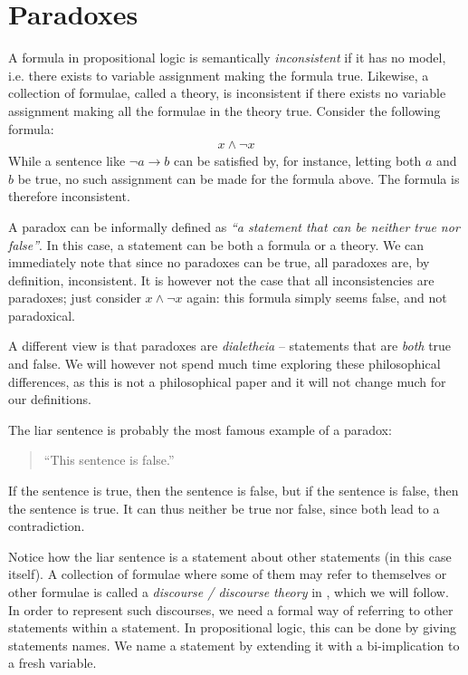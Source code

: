 \section{Paradoxes}
\label{sec:Paradoxes}
A formula in propositional logic is semantically \textit{inconsistent} if it has no model, i.e. there exists to variable assignment making the formula true.
Likewise, a collection of formulae, called a theory, is inconsistent if there exists no variable assignment making all the formulae in the theory true.
Consider the following formula:
\begin{align}
  x \wedge \neg x
\end{align}
While a sentence like $\neg a \rightarrow b$ can be satisfied by, for instance, letting both $a$ and $b$ be true, no such assignment can be made for the formula above.
The formula is therefore inconsistent.

A paradox can be informally defined as \textit{``a statement that can be neither true nor false''}.
In this case, a statement can be both a formula or a theory.
We can immediately note that since no paradoxes can be true, all paradoxes are, by definition, inconsistent.
It is however not the case that all inconsistencies are paradoxes;
just consider $x \wedge \neg x$ again: this formula simply seems false, and not paradoxical.

A different view is that paradoxes are \textit{dialetheia} -- statements that are \textit{both} true and false\cite{sep-dialetheism}.
We will however not spend much time exploring these philosophical differences, as this is not a philosophical paper and it will not change much for our definitions.

The liar sentence is probably the most famous example of a paradox:
\begin{quote}
  ``This sentence is false.''
\end{quote}
If the sentence is true, then the sentence is false, but if the sentence is false, then the sentence is true.
It can thus neither be true nor false, since both lead to a contradiction.

Notice how the liar sentence is a statement about other statements (in this case itself).
A collection of formulae where some of them may refer to themselves or other formulae is called a \textit{discourse / discourse theory} in \cite{synthese-pdl}, which we will follow.
In order to represent such discourses, we need a formal way of referring to other statements within a statement.
In propositional logic, this can be done by giving statements names.
We name a statement by extending it with a bi-implication to a fresh variable.

